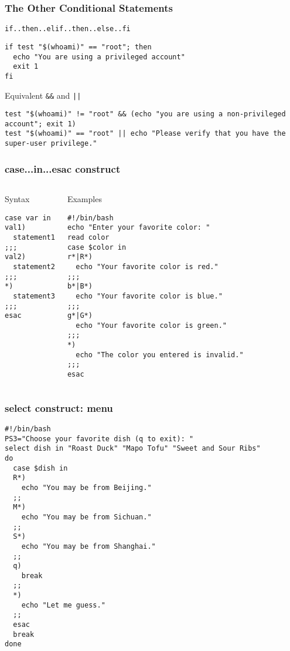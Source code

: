 \documentclass[red]{beamer}
\begin{document}
\begin{CJK*}{UTF8}{gbsn}
\begin{frame}
\frametitle{The Other Conditional Statements}
\begin{block}{\centering \texttt{if..then..elif..then..else..fi}}
\begin{lstlisting}
if test "$(whoami)" == "root"; then
  echo "You are using a privileged account"
  exit 1
fi
\end{lstlisting}
\end{block}
\begin{block}{\centering Equivalent \texttt{\&\&} and \texttt{||} }
\begin{lstlisting}
test "$(whoami)" != "root" && (echo "you are using a non-privileged account"; exit 1)
test "$(whoami)" == "root" || echo "Please verify that you have the super-user privilege."
\end{lstlisting}
\end{block}
\end{frame}


\begin{frame}
\frametitle{case...in...esac construct}
\begin{columns}[t]
\begin{block}{\centering Syntax}
\begin{lstlisting}
case var in
val1)
  statement1
;;;
val2)
  statement2
;;;
*)
  statement3
;;;
esac
\end{lstlisting}
\end{block}
\begin{block}{\centering Examples}
\begin{lstlisting}
#!/bin/bash
echo "Enter your favorite color: "
read color
case $color in 
r*|R*)
  echo "Your favorite color is red."
;;;
b*|B*)
  echo "Your favorite color is blue."
;;;
g*|G*)
  echo "Your favorite color is green."
;;;
*)
  echo "The color you entered is invalid."
;;;
esac
\end{lstlisting}
\end{block}
\end{columns}
\end{frame}


\begin{frame}
\frametitle{select construct: menu}
\begin{lstlisting}
#!/bin/bash
PS3="Choose your favorite dish (q to exit): "
select dish in "Roast Duck" "Mapo Tofu" "Sweet and Sour Ribs"
do
  case $dish in 
  R*)
    echo "You may be from Beijing."
  ;;
  M*)
    echo "You may be from Sichuan."
  ;;
  S*)
    echo "You may be from Shanghai."
  ;;
  q)
    break
  ;;
  *)
    echo "Let me guess."
  ;;
  esac
  break
done
\end{lstlisting}
\end{frame}


\end{CJK*}
\end{document}
